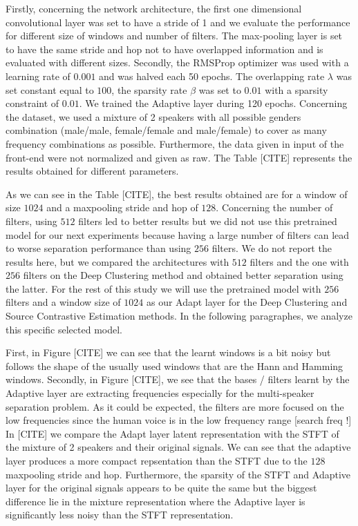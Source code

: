 \documentclass[master,final,11pt]{iscs-thesis}
\begin{document}
Firstly, concerning the network architecture, the first one dimensional convolutional layer was set to have a stride of 1 and we evaluate the performance for different size of windows and number of filters. The max-pooling layer is set to have the same stride and hop not to have overlapped information and is evaluated with different sizes. 
Secondly, the RMSProp optimizer was used with a learning rate of $0.001$ and was halved each 50 epochs. The overlapping rate $\lambda$ was set constant equal to $100$, the sparsity rate $\beta$ was set to $0.01$ with a sparsity constraint of $0.01$. 
We trained the Adaptive layer during 120 epochs.
Concerning the dataset, we used a mixture of 2 speakers with all possible genders combination (male/male, female/female and male/female) to cover as many frequency combinations as possible. Furthermore, the data given in input of the front-end were not normalized and given as raw. 
The Table [CITE] represents the results obtained for different parameters.

	
As we can see in the Table [CITE], the best results obtained are for a window of size $1024$ and a maxpooling stride and hop of $128$. Concerning the number of filters, using $512$ filters led to better results but we did not use this pretrained model for our next experiments because having a large number of filters can lead to worse separation performance than using $256$ filters. We do not report the results here, but we compared the architectures with $512$ filters and the one with $256$ filters on the Deep Clustering method and obtained better separation using the latter.
For the rest of this study we will use the pretrained model with $256$ filters and a window size of $1024$ as our Adapt layer for the Deep Clustering and Source 
Contrastive Estimation methods. In the following paragraphes, we analyze this specific selected model.

First, in Figure [CITE] we can see that the learnt windows is a bit noisy but follows the shape of the usually used windows that are the Hann and Hamming windows.
Secondly, in Figure [CITE], we see that the bases / filters learnt by the Adaptive layer are extracting frequencies especially for the multi-speaker separation problem. As it could be expected, the filters are more focused on the low frequencies since the human voice is in the low frequency range [search freq !]
In [CITE] we compare the Adapt layer latent representation with the STFT of the mixture of 2 speakers and their original signals. We can see that the adaptive layer produces a more compact repsentation than the STFT due to the $128$ maxpooling stride and hop. Furthermore, the sparsity of the STFT and Adaptive layer for the original signals appears to be quite the same but the biggest difference lie in the mixture representation where the Adaptive layer is significantly less noisy than the STFT representation.
\end{document}
